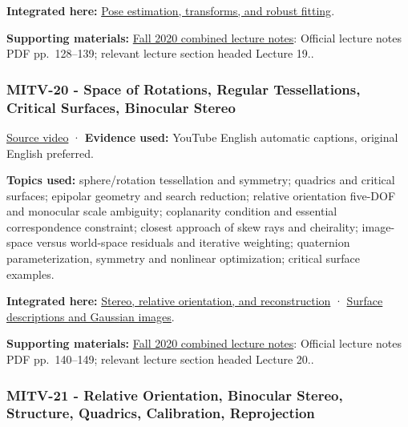 \textbf{Integrated here:} \hyperref[04-visual-computing-ii-ch032-pose-estimation-transforms-and-robust-fitting]{Pose estimation, transforms, and robust fitting}.

\textbf{Supporting materials:} \href{https://ocw.mit.edu/courses/6-801-machine-vision-fall-2020/9ec44f69e72995c370b3797818ba01e6_MIT6_801F20_lectureNotes.pdf}{Fall 2020 combined lecture notes}: Official lecture notes PDF pp.~128--139; relevant lecture section headed Lecture 19..

\subsubsection{MITV-20 - Space of Rotations, Regular Tessellations, Critical Surfaces, Binocular Stereo}\label{04-visual-computing-ii-ch036-mitv-20---space-of-rotations-regular-tessellations-critical-surfaces-binocular-stereo}

\hypertarget{04-visual-computing-ii-ch036-mitv-20---space-of-rotations-regular-tessellations-critical-surfaces-binocular-stereo}{}

\href{https://www.youtube.com/watch?v=Mcy-LlcD8jI}{Source video} · \textbf{Evidence used:} YouTube English automatic captions, original English preferred.

\textbf{Topics used:} sphere/rotation tessellation and symmetry; quadrics and critical surfaces; epipolar geometry and search reduction; relative orientation five-DOF and monocular scale ambiguity; coplanarity condition and essential correspondence constraint; closest approach of skew rays and cheirality; image-space versus world-space residuals and iterative weighting; quaternion parameterization, symmetry and nonlinear optimization; critical surface examples.

\textbf{Integrated here:} \hyperref[04-visual-computing-ii-ch032-stereo-relative-orientation-and-reconstruction]{Stereo, relative orientation, and reconstruction} · \hyperref[04-visual-computing-ii-ch032-surface-descriptions-and-gaussian-images]{Surface descriptions and Gaussian images}.

\textbf{Supporting materials:} \href{https://ocw.mit.edu/courses/6-801-machine-vision-fall-2020/9ec44f69e72995c370b3797818ba01e6_MIT6_801F20_lectureNotes.pdf}{Fall 2020 combined lecture notes}: Official lecture notes PDF pp.~140--149; relevant lecture section headed Lecture 20..

\subsubsection{MITV-21 - Relative Orientation, Binocular Stereo, Structure, Quadrics, Calibration, Reprojection}\label{04-visual-computing-ii-ch036-mitv-21---relative-orientation-binocular-stereo-structure-quadrics-calibration-reprojection}

